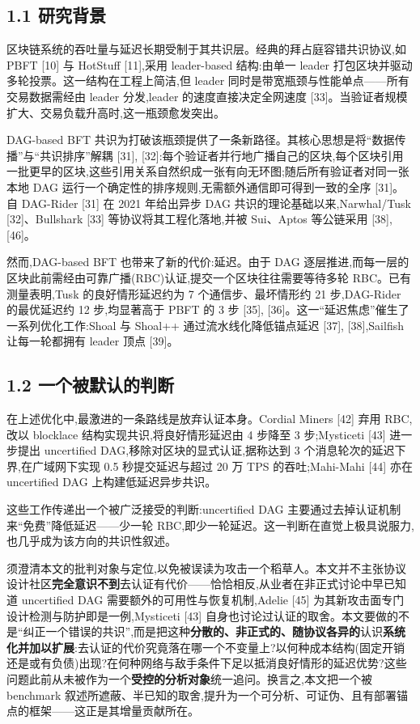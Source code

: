 \documentclass[UTF8,fontset=windows,a4paper,11pt]{ctexart}
\begin{document}
\subsection{1.1 研究背景}\label{ux7814ux7a76ux80ccux666f}

区块链系统的吞吐量与延迟长期受制于其共识层。经典的拜占庭容错共识协议,如
PBFT {[}10{]} 与 HotStuff {[}11{]},采用 leader-based 结构:由单一 leader
打包区块并驱动多轮投票。这一结构在工程上简洁,但 leader
同时是带宽瓶颈与性能单点------所有交易数据需经由 leader 分发,leader
的速度直接决定全网速度
{[}33{]}。当验证者规模扩大、交易负载升高时,这一瓶颈愈发突出。

DAG-based BFT
共识为打破该瓶颈提供了一条新路径。其核心思想是将``数据传播''与``共识排序''解耦
{[}31{]},
{[}32{]}:每个验证者并行地广播自己的区块,每个区块引用一批更早的区块,这些引用关系自然织成一张有向无环图;随后所有验证者对同一张本地
DAG 运行一个确定性的排序规则,无需额外通信即可得到一致的全序 {[}31{]}。自
DAG-Rider {[}31{]} 在 2021 年给出异步 DAG
共识的理论基础以来,Narwhal/Tusk {[}32{]}、Bullshark {[}33{]}
等协议将其工程化落地,并被 Sui、Aptos 等公链采用 {[}38{]}, {[}46{]}。

然而,DAG-based BFT 也带来了新的代价:延迟。由于 DAG
逐层推进,而每一层的区块此前需经由可靠广播(RBC)认证,提交一个区块往往需要等待多轮
RBC。已有测量表明,Tusk 的良好情形延迟约为 7 个通信步、最坏情形约 21
步,DAG-Rider 的最优延迟约 12 步,均显著高于 PBFT 的 3 步 {[}35{]},
{[}36{]}。这一``延迟焦虑''催生了一系列优化工作:Shoal 与 Shoal++
通过流水线化降低锚点延迟 {[}37{]}, {[}38{]},Sailfish 让每一轮都拥有
leader 顶点 {[}39{]}。

\subsection{1.2
一个被默认的判断}\label{ux4e00ux4e2aux88abux9ed8ux8ba4ux7684ux5224ux65ad}

在上述优化中,最激进的一条路线是放弃认证本身。Cordial Miners {[}42{]}
弃用 RBC,改以 blocklace 结构实现共识,将良好情形延迟由 4 步降至 3
步;Mysticeti {[}43{]} 进一步提出 uncertified
DAG,移除对区块的显式认证,据称达到 3 个消息轮次的延迟下界,在广域网下实现
0.5 秒提交延迟与超过 20 万 TPS 的吞吐;Mahi-Mahi {[}44{]} 亦在
uncertified DAG 上构建低延迟异步共识。

这些工作传递出一个被广泛接受的判断:uncertified DAG
主要通过去掉认证机制来``免费''降低延迟------少一轮
RBC,即少一轮延迟。这一判断在直觉上极具说服力,也几乎成为该方向的共识性叙述。

须澄清本文的批判对象与定位,以免被误读为攻击一个稻草人。本文并不主张协议设计社区\textbf{完全意识不到}去认证有代价------恰恰相反,从业者在非正式讨论中早已知道
uncertified DAG 需要额外的可用性与恢复机制,Adelie {[}45{]}
为其新攻击面专门设计检测与防护即是一例,Mysticeti {[}43{]}
自身也讨论过认证的取舍。本文要做的不是``纠正一个错误的共识'',而是把这种\textbf{分散的、非正式的、随协议各异的}认识\textbf{系统化并加以扩展}:去认证的代价究竟落在哪一个不变量上?以何种成本结构(固定开销还是或有负债)出现?在何种网络与敌手条件下足以抵消良好情形的延迟优势?这些问题此前从未被作为一个\textbf{受控的分析对象}统一追问。换言之,本文把一个被
benchmark
叙述所遮蔽、半已知的取舍,提升为一个可分析、可证伪、且有部署锚点的框架------这正是其增量贡献所在。
\end{document}
